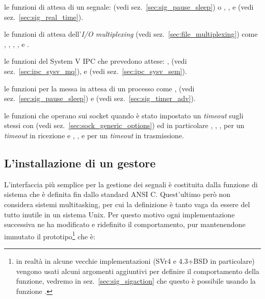 \begin{itemize*}
\item le funzioni di attesa di un segnale:  (vedi
  sez.~\ref{sec:sig_pause_sleep}) o , , e
   (vedi sez.~\ref{sec:sig_real_time}).
\item le funzioni di attesa dell'\textit{I/O multiplexing} (vedi
  sez.~\ref{sec:file_multiplexing}) come , ,
  , ,  e .
\item le funzioni del System V IPC che prevedono attese: ,
   (vedi sez.~\ref{sec:ipc_sysv_mq}),  e
   (vedi sez.~\ref{sec:ipc_sysv_sem}).
\item le funzioni per la messa in attesa di un processo come ,
   (vedi sez.~\ref{sec:sig_pause_sleep}) e
   (vedi sez.~\ref{sec:sig_timer_adv}).
\item le funzioni che operano sui socket quando è stato impostato un
  \textit{timeout} sugli stessi con  (vedi
  sez.~\ref{sec:sock_generic_options}) ed in particolare ,
  , ,  per un \textit{timeout} in
  ricezione e , ,  e  per
  un \textit{timeout} in trasmissione.
\end{itemize*}




\subsection{L'installazione di un gestore}
\label{sec:sig_signal}

L'interfaccia più semplice per la gestione dei segnali è costituita dalla
funzione di sistema  che è definita fin dallo standard ANSI C.
Quest'ultimo però non considera sistemi multitasking, per cui la definizione è
tanto vaga da essere del tutto inutile in un sistema Unix. Per questo motivo
ogni implementazione successiva ne ha modificato e ridefinito il
comportamento, pur mantenendone immutato il prototipo\footnote{in realtà in
  alcune vecchie implementazioni (SVr4 e 4.3+BSD in particolare) vengono usati
  alcuni argomenti aggiuntivi per definire il comportamento della funzione,
  vedremo in sez.~\ref{sec:sig_sigaction} che questo è possibile usando la
  funzione .}  che è:

